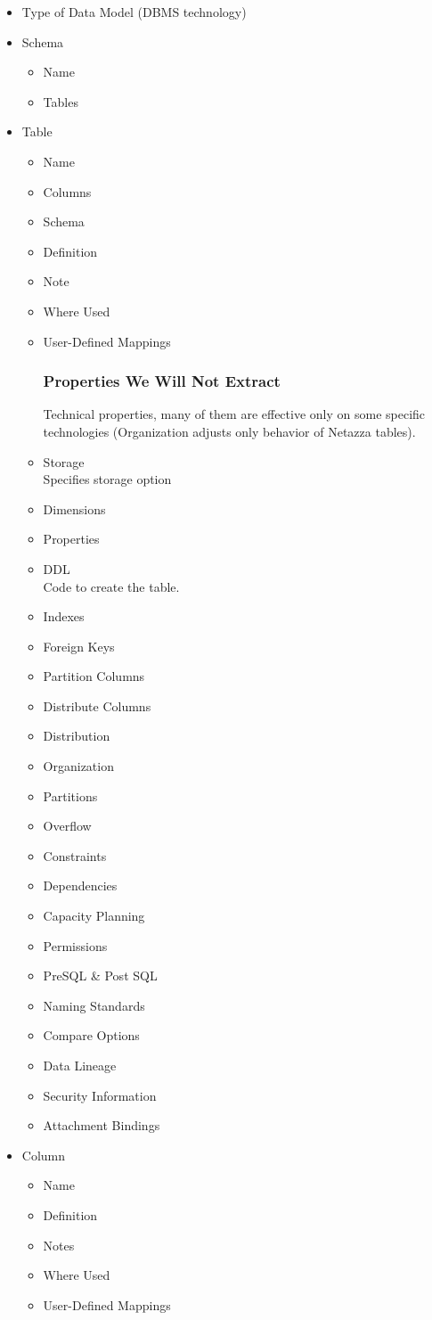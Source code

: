 \documentclass[12pt,a4paper]{report}
\begin{document}
\begin{itemize}
	\item Type of Data Model (DBMS technology)
	\item Schema
	\begin{itemize}
		\item Name
		\item Tables
	\end{itemize}
	\item Table
	\begin{itemize}
		\item Name
		\item Columns
		\item Schema
		\item Definition
		\item Note
		\item Where Used
		\item User-Defined Mappings
		\subsubsection{Properties We Will Not Extract}
		Technical properties, many of them are effective only on some specific technologies (Organization adjusts only behavior of Netazza tables). 
		\item Storage \\ 
		Specifies storage option
		\item Dimensions
		\item Properties
		\item DDL \\ 
		Code to create the table.
		\item Indexes
		\item Foreign Keys
		\item Partition Columns
		\item Distribute Columns
		\item Distribution
		\item Organization
		\item Partitions
		\item Overflow
		\item Constraints
		\item Dependencies
		\item Capacity Planning
		\item Permissions
		\item PreSQL \& Post SQL
		\item Naming Standards
		\item Compare Options
		\item Data Lineage
		\item Security Information
		\item Attachment Bindings
	\end{itemize}
	\item Column
	\begin{itemize}
		\item Name
		\item Definition
		\item Notes
		\item Where Used
		\item User-Defined Mappings

\end{itemize}
\end{itemize}
\end{document}
